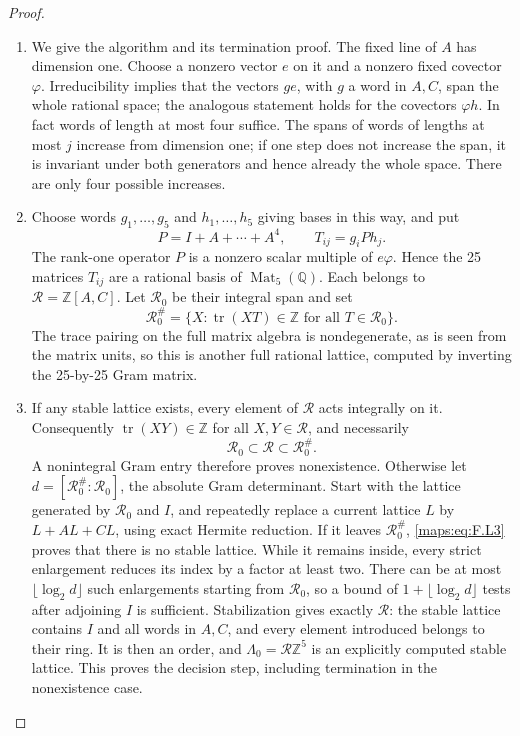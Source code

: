 \documentclass[11pt,a4paper]{article}
\theoremstyle{definition}
\begin{document}
\begin{proof}
\begin{enumerate}[label=\arabic*.]
\item We give the algorithm and its termination proof.
The fixed line of $A$ has dimension one.  Choose a nonzero
vector $e$ on it and a nonzero fixed covector $\varphi$.
Irreducibility implies that the vectors $ge$, with $g$ a
word in $A,C$, span the whole rational space; the analogous
statement holds for the covectors $\varphi h$.
In fact words of length at most four suffice.  The spans of
words of lengths at most $j$ increase from dimension one;
if one step does not increase the span, it is invariant
under both generators and hence already the whole space.
There are only four possible increases.

\item Choose words $g_1,\ldots,g_5$ and $h_1,\ldots,h_5$ giving
bases in this way, and put
\[
 P=I+A+\cdots+A^4,\qquad T_{ij}=g_iPh_j.
 \tag{F.L1}\label{maps:eq:F.L1}
\]
The rank-one operator $P$ is a nonzero scalar multiple of
$e\varphi$.  Hence the 25 matrices $T_{ij}$ are a rational
basis of $\operatorname{Mat}_5(\mathbb Q)$.
Each belongs to $\mathcal R=\mathbb Z[A,C]$.
Let $\mathcal R_0$ be their integral span and set
\[
 \mathcal R_0^\#=
 \{X:\operatorname{tr}(XT)\in\mathbb Z
                     \text{ for all }T\in\mathcal R_0\}.
 \tag{F.L2}\label{maps:eq:F.L2}
\]
The trace pairing on the full matrix algebra is
nondegenerate, as is seen from the matrix units, so this
is another full rational lattice, computed by inverting
the 25-by-25 Gram matrix.

\item If any stable lattice exists, every element of $\mathcal R$
acts integrally on it.  Consequently
$\operatorname{tr}(XY)\in\mathbb Z$ for all
$X,Y\in\mathcal R$, and necessarily
\[
 \mathcal R_0\subset\mathcal R\subset\mathcal R_0^\#.
 \tag{F.L3}\label{maps:eq:F.L3}
\]
A nonintegral Gram entry therefore proves nonexistence.
Otherwise let
$d=[\mathcal R_0^\#:\mathcal R_0]$, the absolute Gram
determinant.  Start with the lattice generated by
$\mathcal R_0$ and $I$, and repeatedly replace a current
lattice $L$ by $L+AL+CL$, using exact Hermite reduction.
If it leaves $\mathcal R_0^\#$, \eqref{maps:eq:F.L3} proves that there
is no stable lattice.
While it remains inside, every strict enlargement reduces
its index by a factor at least two.
There can be at most $\lfloor\log_2d\rfloor$ such
enlargements starting from $\mathcal R_0$, so a bound of
$1+\lfloor\log_2d\rfloor$ tests after adjoining $I$ is
sufficient.  Stabilization gives exactly $\mathcal R$:
the stable lattice contains $I$ and all words in $A,C$,
and every element introduced belongs to their ring.
It is then an order, and
$\Lambda_0=\mathcal R\mathbb Z^5$ is an explicitly
computed stable lattice.  This proves the decision step,
including termination in the nonexistence case.


\end{enumerate}
\end{proof}
\end{document}
